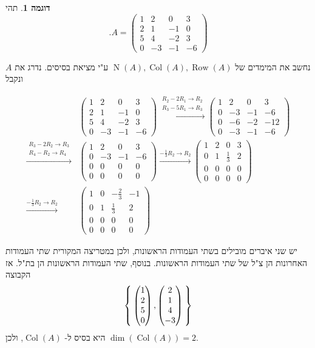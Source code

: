 \documentclass[12pt]{report}
\theoremstyle{plain}
\theoremstyle{definition}
\newtheorem{example}{דוגמה}[chapter]
\newcommand{\0}{\mathbf{0}}
\DeclareMathOperator{\Row}{Row}
\DeclareMathOperator{\Col}{Col}
\DeclareMathOperator{\Null}{N}
\begin{document}
\begin{example}
תהי
$$
.A=\begin{pmatrix}
1 & 2 & 0 & 3 \\
2 & 1 & -1 & 0 \\
5 & 4 & -2 & 3 \\
0 & -3 & -1 & -6
\end{pmatrix}
$$

נחשב את המימדים של 
$\Null(A),\Col(A),\Row(A)$
ע"י מציאת בסיסים. נדרג את
$A$
ונקבל

$$
\begin{aligned}
&\begin{pmatrix}
1 & 2 & 0 & 3 \\
2 & 1 & -1 & 0 \\
5 & 4 & -2 & 3 \\
0 & -3 & -1 & -6
\end{pmatrix}
\xrightarrow{
\substack{
R_2 - 2R_1 \to R_2\\
R_3 - 5R_1 \to R_3
}
}
\begin{pmatrix}
1 & 2 & 0 & 3 \\
0 & -3 & -1 & -6 \\
0 & -6 & -2 & -12 \\
0 & -3 & -1 & -6
\end{pmatrix} \\
\xrightarrow{
\substack{
R_3 - 2R_2 \to R_3 \\
R_4 - R_2 \to R_4
}
}
&\begin{pmatrix}
1 & 2 & 0 & 3 \\
0 & -3 & -1 & -6 \\
0 & 0 & 0 & 0 \\
0 & 0 & 0 & 0
\end{pmatrix}\xrightarrow{-\frac{1}{3}R_2\to R_2}
\begin{pmatrix}
1 & 2 & 0 & 3 \\
0 & 1 & \frac{1}{3} & 2 \\
0 & 0 & 0 & 0 \\
0 & 0 & 0 & 0
\end{pmatrix} \\
\xrightarrow{-\frac{1}{3}R_2\to R_2}
&\begin{pmatrix}
1 & 0 & -\frac{2}{3} & -1 \\
0 & 1 & \frac{1}{3} & 2 \\
0 & 0 & 0 & 0 \\
0 & 0 & 0 & 0
\end{pmatrix}
\end{aligned}
$$

יש שני איברים מובילים בשתי העמודות הראשונות, ולכן במטריצה המקורית שתי העמודות האחרונות הן צ"ל של שתי העמודות הראשונות. בנוסף, שתי העמודות הראשונות הן בת"ל. אז הקבוצה
$$
\Set{\begin{pmatrix}
1 \\
2 \\
5\\
0
\end{pmatrix},\begin{pmatrix}
2 \\
1 \\
4\\
-3
\end{pmatrix}}
$$
היא בסיס ל-
$\Col(A)$, 
ולכן
$\dim(\Col(A))=2$.


\end{example}
\end{document}
